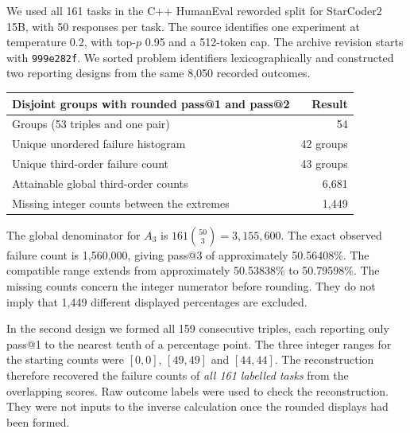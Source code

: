 We used all 161 tasks in the C++ HumanEval reworded split for StarCoder2 15B, with 50 responses per task. The source identifies one experiment at temperature 0.2, with top-$p$ 0.95 and a 512-token cap. The archive revision starts with \texttt{999e282f}. We sorted problem identifiers lexicographically and constructed two reporting designs from the same 8,050 recorded outcomes.

\begin{center}\begin{tabular}{lr}\toprule
Disjoint groups with rounded pass@1 and pass@2 & Result\\\midrule
Groups (53 triples and one pair) & 54\\
Unique unordered failure histogram & 42 groups\\
Unique third-order failure count & 43 groups\\
Attainable global third-order counts & 6,681\\
Missing integer counts between the extremes & 1,449\\\bottomrule
\end{tabular}\end{center}
The global denominator for $A_3$ is $161\binom{50}{3}=3{,}155{,}600$. The exact observed failure count is 1,560,000, giving pass@3 of approximately 50.56408\%. The compatible range extends from approximately 50.53838\% to 50.79598\%. The missing counts concern the integer numerator before rounding. They do not imply that 1,449 different displayed percentages are excluded.

In the second design we formed all 159 consecutive triples, each reporting only pass@1 to the nearest tenth of a percentage point. The three integer ranges for the starting counts were $[0,0]$, $[49,49]$ and $[44,44]$. The reconstruction therefore recovered the failure counts of \emph{all 161 labelled tasks} from the overlapping scores. Raw outcome labels were used to check the reconstruction. They were not inputs to the inverse calculation once the rounded displays had been formed.
